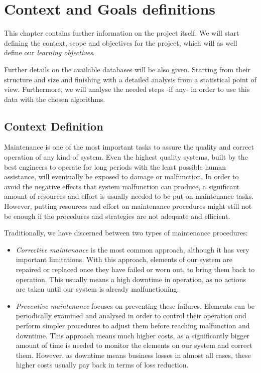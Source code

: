\chapter{Context and Goals definitions}
\label{chap:context_and_goals}
\begin{chapterintro}
This chapter contains further information on the project itself. We will start defining the context, scope and objectives for the project, which will as well define our \emph{learning objectives}.

Further details on the available databases will be also given. Starting from their structure and size and finishing with a detailed analysis from a statistical point of view. Furthermore, we will analyse the needed steps -if any- in order to use this data with the chosen algorithms.


\end{chapterintro}

\section{Context Definition}
\label{sec:context}
Maintenance is one of the most important tasks to assure the quality and correct operation of any kind of system. Even the highest quality systems, built by the best engineers to operate for long periods with the least possible human assistance, will eventually be exposed to damage or malfunction. In order to avoid the negative effects that system malfunction can produce, a significant amount of resources and effort is usually needed to be put on maintenance tasks. However, putting resources and effort on maintenance procedures might still not be enough if the procedures and strategies are not adequate and efficient.

Traditionally, we have discerned between two types of maintenance procedures:
\begin{itemize}
\item \emph{Corrective maintenance} is the most common approach, although it has very important limitations. With this approach, elements of our system are repaired or replaced once they have failed or worn out, to bring them back to operation. This usually means a high downtime in operation, as no actions are taken until our system is already malfunctioning.

\item \emph{Preventive maintenance} focuses on preventing these failures. Elements can be periodically examined and analysed in order to control their operation and perform simpler procedures to adjust them before reaching malfunction and downtime. This approach means much higher costs, as a significantly bigger amount of time is needed to monitor the elements on our system and correct them. However, as downtime means business losses in almost all cases, these higher costs usually pay back in terms of loss reduction.
\end{itemize}

